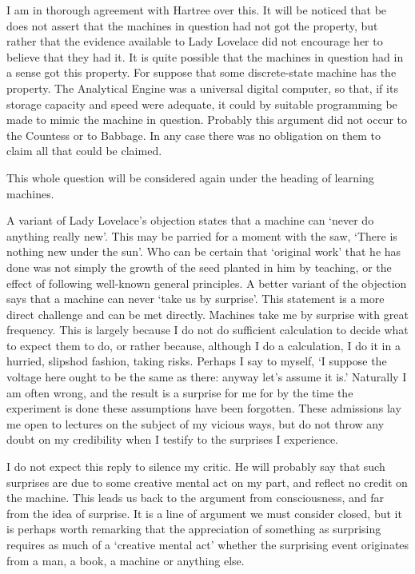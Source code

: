 \documentclass[12pt]{article}
\begin{document}
    I am in thorough agreement with Hartree over this. It will be noticed that be does not assert that the machines in question had not got the property, but rather that the evidence available to Lady Lovelace did not encourage her to believe that they had it. It is quite possible that the machines in question had in a sense got this property. For suppose that some discrete-state machine has the property. The Analytical Engine was a universal digital computer, so that, if its storage capacity and speed were adequate, it could by suitable programming be made to mimic the machine in question. Probably this argument did not occur to the Countess or to Babbage. In any case there was no obligation on them to claim all that could be claimed.

    This whole question will be considered again under the heading of learning machines.

    A variant of Lady Lovelace's objection states that a machine can ‘never do anything really new'. This may be parried for a moment with the saw, ‘There is nothing new under the sun'. Who can be certain that ‘original work' that he has done was not simply the growth of the seed planted in him by teaching, or the effect of following well-known general principles. A better variant of the objection says that a machine can never ‘take us by surprise'. This statement is a more direct challenge and can be met directly. Machines take me by surprise with great frequency. This is largely because I do not do sufficient calculation to decide what to expect them to do, or rather because, although I do a calculation, I do it in a hurried, slipshod fashion, taking risks. Perhaps I say to myself, ‘I suppose the voltage here ought to be the same as there: anyway let's assume it is.' Naturally I am often wrong, and the result is a surprise for me for by the time the experiment is done these assumptions have been forgotten. These admissions lay me open to lectures on the subject of my vicious ways, but do not throw any doubt on my credibility when I testify to the surprises I experience.

    I do not expect this reply to silence my critic. He will probably say that such surprises are due to some creative mental act on my part, and reflect no credit on the machine. This leads us back to the argument from consciousness, and far from the idea of surprise. It is a line of argument we must consider closed, but it is perhaps worth remarking that the appreciation of something as surprising requires as much of a ‘creative mental act' whether the surprising event originates from a man, a book, a machine or anything else.
\end{document}
